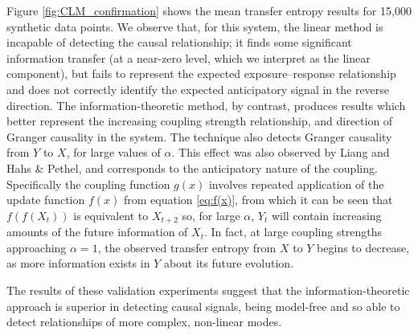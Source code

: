 \documentclass[]{rsos}%
\begin{document}
{  Figure \ref{fig:CLM_confirmation} shows the mean transfer entropy results for 15,000 synthetic data points. We observe that, for this system, the linear method is incapable of detecting the causal relationship; it finds some significant information transfer (at a near-zero level, which we interpret as the linear component), but fails to represent the expected exposure–response relationship and does not correctly identify the expected anticipatory signal in the reverse direction. The information-theoretic method, by contrast, produces results which better represent the increasing coupling strength relationship, and direction of Granger causality in the system. The technique also detects Granger causality from $Y$ to $X$, for large values of $\alpha$. This effect was also observed by Liang and Hahs \& Pethel, and corresponds to the anticipatory nature of the coupling. Specifically the coupling function $g(x)$ involves repeated application of the update function $f(x)$ from equation \ref{eq:f(x)}, from which it can be seen that $f(f(X_t))$ is equivalent to $X_{t+2}$ so, for large $\alpha$, $Y_t$ will contain increasing amounts of the future information of $X_t$. In fact, at large coupling strengths approaching $\alpha=1$, the observed transfer entropy from $X$ to $Y$ begins to decrease, as more information exists in $Y$ about its future evolution.

  The results of these validation experiments suggest that the information-theoretic approach is superior in detecting causal signals, being model-free and so able to detect relationships of more complex, non-linear modes.

}
\end{document}
